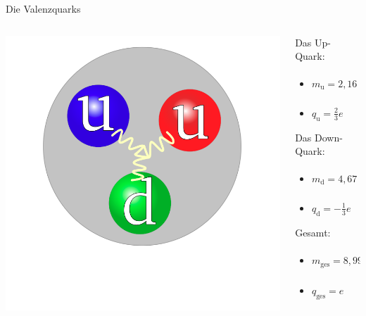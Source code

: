 \documentclass[aspectratio=1610, 9pt]{beamer}
\begin{document}
\begin{frame}{Die Valenzquarks}
  \begin{columns}
    \begin{column}{0.40\textwidth}
      \includegraphics[width = \textwidth]{images/Proton.png} 
    \end{column}

    \begin{column}{0.45\textwidth}
      Das Up-Quark:
      \begin{itemize}
        \item{ $ m_\text{u} = 2,16 \substack{+0.49 \\ -0.26} \,\mathrm{MeV} $  }
        \item{ $ q_\text{u} = \frac{2}{3} e$ }
      \end{itemize}
      
      Das Down-Quark:
      \begin{itemize}
        \item{ $ m_\text{d} = 4,67 \substack{+0.48 \\ -0.17} \,\mathrm{MeV} $  }
        \item{ $q_\text{d} = - \frac{1}{3} e$ }
      \end{itemize}

      Gesamt:
      \begin{itemize}
        \item{ $ m_\text{ges} = 8,99 \substack{+1,09 \\ -0.55} \,\mathrm{MeV} $  }
        \item{ $ q_\text{ges} =  e$ }
      \end{itemize}      

    \end{column}
  \end{columns}
\end{frame}
\end{document}
